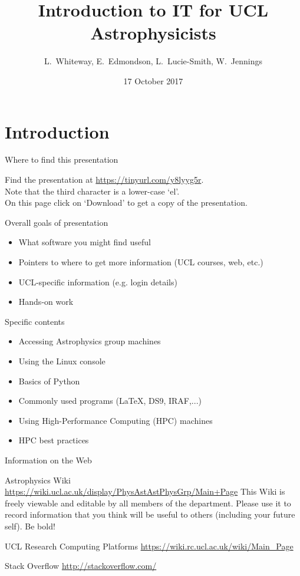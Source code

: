 \documentclass{beamer}
\title[IT Workshops] %
{Introduction to IT for UCL Astrophysicists}
\author{L.~Whiteway, E.~Edmondson, L.~Lucie-Smith, W.~Jennings}
\institute[UCL]
{
  Astrophysics Group\\
  Department of Physics and Astronomy\\
  University College London
}
\date
{17 October 2017}
\begin{document}
\frame{\titlepage}

\section{Introduction}

\begin{frame}{Where to find this presentation}
  \begin{block}{}
    Find the presentation at \alert{\url{https://tinyurl.com/y8lyyg5r}}.\\
    Note that the third character is a lower-case `el'. \\
    On this page click on `Download' to get a copy of the presentation.
  \end{block}
\end{frame}


\begin{frame}{Overall goals of presentation}
  \begin{itemize}
    \item What software you might find useful
    \item Pointers to where to get more information (UCL courses, web, etc.)
    \item UCL-specific information (e.g. login details)
    \item Hands-on work
  \end{itemize}
\end{frame}

\begin{frame}{Specific contents}
  \begin{itemize}
    \item Accessing Astrophysics group machines
    \item Using the Linux console
    \item Basics of Python
    \item Commonly used programs (LaTeX, DS9, IRAF,...)
    \item Using High-Performance Computing (HPC) machines
    \item HPC best practices
  \end{itemize}
\end{frame}

\begin{frame}{Information on the Web}
  \begin{block}{Astrophysics Wiki}
    \url{https://wiki.ucl.ac.uk/display/PhysAstAstPhysGrp/Main+Page}
    This Wiki is freely viewable and editable by all members of the department. Please use it to record information that you think will be useful to others (including your future self). Be bold!
  \end{block}

  \begin{block}{UCL Research Computing Platforms}
    \url{https://wiki.rc.ucl.ac.uk/wiki/Main_Page}
  \end{block}
  
  \begin{block}{Stack Overflow}
    \url{http://stackoverflow.com/}
  \end{block}
  
\end{frame}
\end{document}

